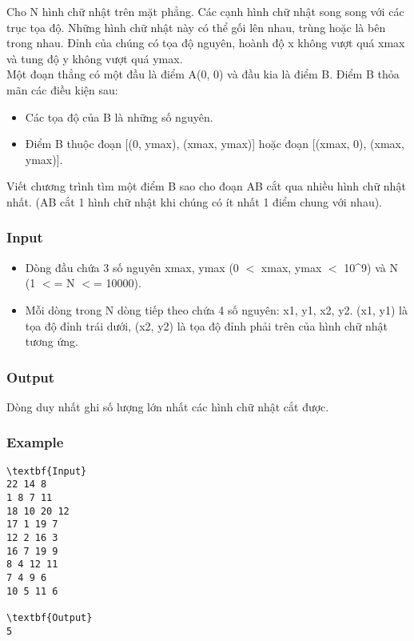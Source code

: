 

Cho N hình chữ nhật trên mặt phẳng. Các cạnh hình chữ nhật song song với các trục tọa độ. Những hình chữ nhật này có thể gối lên nhau, trùng hoặc là bên trong nhau. Đỉnh của chúng có tọa độ nguyên, hoành độ x không vượt quá xmax và tung độ y không vượt quá ymax.
\\Một đoạn thẳng có một đầu là điểm A(0, 0) và đầu kia là điểm B. Điểm B thỏa mãn các điều kiện sau:
\begin{itemize}
	\item Các tọa độ của B là những số nguyên.
	\item Điểm B thuộc đoạn [(0, ymax), (xmax, ymax)] hoặc đoạn [(xmax, 0), (xmax, ymax)].
\end{itemize}

Viết chương trình tìm một điểm B sao cho đoạn AB cắt qua nhiều hình chữ nhật nhất. (AB cắt 1 hình chữ nhật khi chúng có ít nhất 1 điểm chung với nhau).

\subsubsection{Input}
\begin{itemize}
	\item Dòng đầu chứa 3 số nguyên xmax, ymax (0 $<$ xmax, ymax $<$ 10\textasciicircum9) và N (1 $<$= N $<$= 10000).
	\item Mỗi dòng trong N dòng tiếp theo chứa 4 số nguyên: x1, y1, x2, y2. (x1, y1) là tọa độ đỉnh trái dưới, (x2, y2) là tọa độ đỉnh phải trên của hình chữ nhật tương ứng.
\end{itemize}

\subsubsection{Output}

Dòng duy nhất ghi số lượng lớn nhất các hình chữ nhật cắt được.

\subsubsection{Example}
\begin{verbatim}
\textbf{Input}
22 14 8
1 8 7 11
18 10 20 12
17 1 19 7
12 2 16 3
16 7 19 9
8 4 12 11
7 4 9 6
10 5 11 6

\textbf{Output}
5
\end{verbatim}